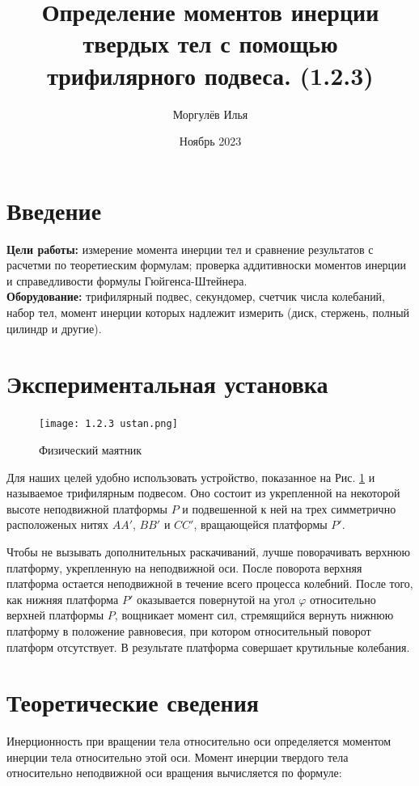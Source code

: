 \documentclass[a4paper,12pt]{article}
\title{\textbf{Определение моментов инерции твердых тел с помощью трифилярного подвеса. (1.2.3)}}
\author{Моргулёв Илья}
\date{Ноябрь 2023}
\begin{document}
	
	\maketitle
	
	\section{Введение}
	
	\textbf{Цели работы:} измерение момента инерции тел и сравнение результатов с расчетми по теоретиеским формулам; проверка аддитивноски моментов инерции и справедливости формулы Гюйгенса-Штейнера.\\
	\textbf{Оборудование:} трифилярный подвес, секундомер, счетчик числа колебаний, набор тел, момент инерции которых надлежит измерить (диск, стержень, полный цилиндр и другие).
	
	\section {Экспериментальная установка}
	
	\begin{figure}
		\texttt{[image: 1.2.3 ustan.png]}
		\caption{Физический маятник}\label{risunok}
	\end{figure}
	
	Для наших целей удобно использовать устройство, показанное на Рис. \ref{risunok} и называемое трифилярным подвесом. Оно состоит из укрепленной на некоторой высоте неподвижной платформы $P$ и подвешенной к ней на трех симметрично расположеных нитях $AA'$, $BB'$ и $CC'$, вращающейся платформы $P'$. 
	
	Чтобы не вызывать дополнительных раскачиваний, лучше поворачивать верхнюю платформу, укрепленную на неподвижной оси. После поворота верхняя платформа остается неподвижной в течение всего процесса колебний. После того, как нижняя платформа $P'$ оказывается повернутой на угол $\varphi$ относительно верхней платформы $P$, вощникает момент сил, стремящийся вернуть нижнюю платформу в положение равновесия, при котором относительный поворот платформ отсутствует. В результате платформа совершает крутильные колебания.
	
	\section{Теоретические сведения}
	
	\par Инерционность при вращении тела относительно оси определяется моментом инерции тела относительно этой оси. Момент инерции твердого тела относительно неподвижной оси вращения вычисляется по формуле:
	
\end{document}
